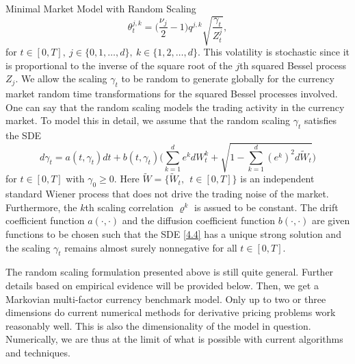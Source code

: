 \documentclass[unknownkeysallowed, compress]{beamer}
\theoremstyle{plain}
\begin{document}
\begin{frame}[allowframebreaks]{Minimal Market Model with Random Scaling}
\begin{equation}\label{4.3}
\theta_t^{j,k} = \bigg(\frac{\nu_j}{2} - 1\bigg)q^{j,k}\sqrt{\frac{\gamma_t}{Z_t^j}},
\end{equation}
for $t\in [0,T],~ j\in\{0,1,\ldots,d\},~k\in\{1,2,\ldots,d\}$. This volatility is stochastic since it is proportional to the inverse of the square root of the $j$th squared Bessel process $Z_j$. We allow the scaling $\gamma_t$ to be random to generate globally for the currency market random time transformations for the squared Bessel processes involved. One can say that the random scaling models the trading activity in the currency market. To model this in detail, we assume that the random scaling $\gamma_t$ satisfies the SDE
\begin{equation}\label{4.4}
d\gamma_t = a(t,\gamma_t)dt+b(t,\gamma_t)\bigg(\sum_{k = 1}^de^k dW_t^k+\sqrt{1-\sum_{k = 1}^d(e^k)^2d\tilde{W}_t}\bigg)
\end{equation}
for $t\in[0,T]$ with $\gamma_0\geq 0.$ Here $\tilde{W} = \{\tilde{W}_t,~~t\in [0,T]\}$ is an independent standard Wiener process that does not drive the trading noise of the market. Furthermore, the $k$th scaling correlation $\varrho^k$ is assued to be constant. The drift coefficient function $a(\cdot,\cdot)$ and the diffusion coefficient function $b(\cdot,\cdot)$ are given functions to be chosen such that the SDE \eqref{4.4} has a unique strong solution and the scaling $\gamma_t$ remains almost surely nonnegative for all $t\in[0,T]$.\\

\par The random scaling formulation presented above is still quite general. Further details based on empirical evidence will be provided below. Then, we get a Markovian multi-factor currency benchmark model. Only up to two or three dimensions do current numerical methods for derivative pricing problems work reasonably well. This is also the dimensionality of the model in question. Numerically, we are thus at the limit of what is possible with current algorithms and techniques.\\ %


\end{frame}
\end{document}
